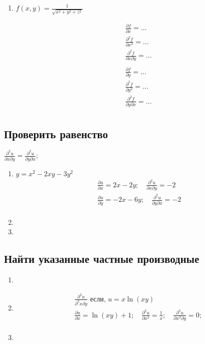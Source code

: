 \begin{enumerate}
  \item %
$f(x, y) = \frac{1}{\sqrt{x^2+y^2+z^2}}$ \\
\begin{paracol}{2}
\begin{align*}
  &\frac{\partial f}{\partial x} = \ldots  \\
  &\frac{\partial^2 f}{\partial x^2} = \ldots  \\
  &\frac{\partial^2 f}{\partial x \partial y} = \ldots  \\
\end{align*}
\switchcolumn
\begin{align*}
  &\frac{\partial f}{\partial y} = ... \\
  &\frac{\partial^2 f}{\partial y^2} = ... \\
  &\frac{\partial^2 f}{\partial y \partial x} = ... \\
\end{align*}
\end{paracol}

\end{enumerate}
\subsection{Проверить равенство}
$\frac{\partial^2 u}{\partial x \partial y} = \frac{\partial^2 u}{\partial y \partial x}$;\quad
\begin{enumerate}
  \item %
$y = x^2 - 2xy - 3y^2 $ \\
\begin{align*}
    &\frac{\partial u}{\partial x} = 2x - 2y; \quad
    \frac{\partial^2 u}{\partial x \partial y} = -2 \\
    \
    &\frac{\partial u}{\partial y} = -2x - 6y;\quad
    \frac{\partial^2 u}{\partial y \partial x} = -2 \\
\end{align*}
  \item %
  \item %
\end{enumerate}
\subsection{Найти указанные частные производные}
\begin{enumerate}
  \item %
  \item %
    \begin{align*}
      &\frac{\partial ^3 u}{\partial ^2 x \partial y} \text{ если, } u = x\ln(xy)\\
      &\frac{\partial u}{\partial x} = \ln(xy) + 1;\quad
      \frac{\partial^2 u}{\partial x^2} = \frac{1}{x};\quad 
      \frac{\partial^3 u}{\partial x^2 \partial y} = 0; \\
    \end{align*}
  \item %
\end{enumerate}
